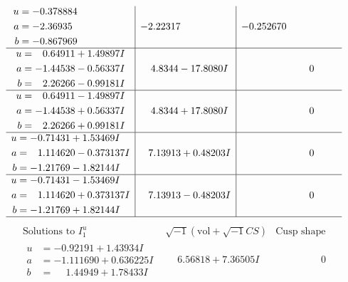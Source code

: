 \documentclass[1p]{elsarticle_modified}
\theoremstyle{definition}
\newcommand{\I}{\sqrt{-1}}
\begin{document}
$$\begin{array}{c|c|c}
\begin{aligned}
u &= -0.378884\phantom{ +0.000000I} \\
a &= -2.36935\phantom{ +0.000000I} \\
b &= -0.867969\phantom{ +0.000000I}\end{aligned}
 & -2.22317\phantom{ +0.000000I} & -0.252670\phantom{ +0.000000I} \\ \hline\begin{aligned}
u &= \phantom{-}0.64911 + 1.49897 I \\
a &= -1.44538 - 0.56337 I \\
b &= \phantom{-}2.26266 - 0.99181 I\end{aligned}
 & \phantom{-}4.8344 - 17.8080 I & \phantom{-0.000000 } 0 \\ \hline\begin{aligned}
u &= \phantom{-}0.64911 - 1.49897 I \\
a &= -1.44538 + 0.56337 I \\
b &= \phantom{-}2.26266 + 0.99181 I\end{aligned}
 & \phantom{-}4.8344 + 17.8080 I & \phantom{-0.000000 } 0 \\ \hline\begin{aligned}
u &= -0.71431 + 1.53469 I \\
a &= \phantom{-}1.114620 - 0.373137 I \\
b &= -1.21769 - 1.82144 I\end{aligned}
 & \phantom{-}7.13913 + 0.48203 I & \phantom{-0.000000 } 0 \\ \hline\begin{aligned}
u &= -0.71431 - 1.53469 I \\
a &= \phantom{-}1.114620 + 0.373137 I \\
b &= -1.21769 + 1.82144 I\end{aligned}
 & \phantom{-}7.13913 - 0.48203 I & \phantom{-0.000000 } 0\\
 \hline 
 \end{array}$$\newpage$$\begin{array}{c|c|c}  
\text{Solutions to }I^u_{1}& \I (\text{vol} + \sqrt{-1}CS) & \text{Cusp shape}\\
 \hline 
\begin{aligned}
u &= -0.92191 + 1.43934 I \\
a &= -1.111690 + 0.636225 I \\
b &= \phantom{-}1.44949 + 1.78433 I\end{aligned}
 & \phantom{-}6.56818 + 7.36505 I & \phantom{-0.000000 } 0 \\ \hline\begin{aligned}

\end{aligned}
\end{array}$$
\end{document}
